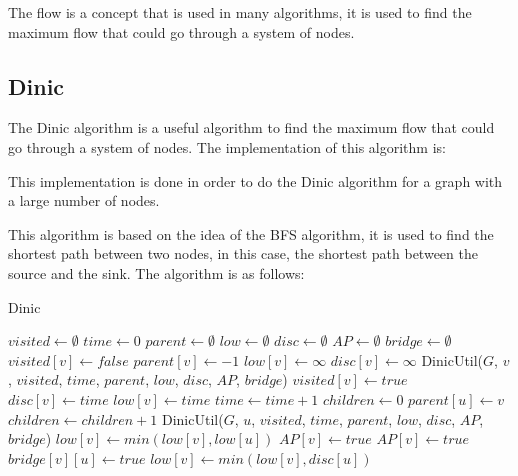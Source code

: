 The flow is a concept that is used in many algorithms, it is used to find the maximum flow that could go through a system of nodes.

\subsection{Dinic}

The Dinic algorithm is a useful algorithm to find the maximum flow that could go through a system of nodes. The implementation of this algorithm is:



This implementation is done in order to do the Dinic algorithm for a graph with a large number of nodes.

This algorithm is based on the idea of the BFS algorithm, it is used to find the shortest path between two nodes, in this case, the shortest path between the source and the sink. The algorithm is as follows:

\begin{algorithm}
\caption{Dinic}
\label{alg:dinic}
\begin{algorithmic}[1]
\State $visited \gets \emptyset$
\State $time \gets 0$
\State $parent \gets \emptyset$
\State $low \gets \emptyset$
\State $disc \gets \emptyset$
\State $AP \gets \emptyset$
\State $bridge \gets \emptyset$
\State $visited[v] \gets false$
\State $parent[v] \gets -1$
\State $low[v] \gets \infty$
\State $disc[v] \gets \infty$
\EndFor
{}
\State DinicUtil($G$, $v$, $visited$, $time$, $parent$, $low$, $disc$, $AP$, $bridge$)
\EndIf
\EndFor
\EndProcedure
{}
\State $visited[v] \gets true$
\State $disc[v] \gets time$
\State $low[v] \gets time$
\State $time \gets time + 1$
\State $children \gets 0$
\State $parent[u] \gets v$
\State $children \gets children + 1$
\State DinicUtil($G$, $u$, $visited$, $time$, $parent$, $low$, $disc$, $AP$, $bridge$)
\State $low[v] \gets min(low[v], low[u])$
\State $AP[v] \gets true$
\EndIf
{}
\State $AP[v] \gets true$
\EndIf
{}
\State $bridge[v][u] \gets true$
\EndIf
\Else
\State $low[v] \gets min(low[v], disc[u])$
\EndIf
\EndFor
\EndProcedure
\end{algorithmic}
\end{algorithm}

